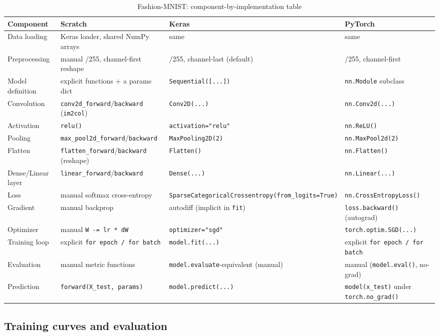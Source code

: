 \documentclass[11pt]{article}
\newcommand{\code}[1]{\texttt{#1}}
\begin{document}
\begin{table}[H]
\centering
\caption{Fashion-MNIST: component-by-implementation table}
\footnotesize
\begin{tabular}{@{}p{2.5cm}p{4.1cm}p{4.1cm}p{4.1cm}@{}}
\toprule
Component & Scratch & Keras & PyTorch \\
\midrule
Data loading & Keras loader, shared NumPy arrays & same & same \\
Preprocessing & manual /255, channel-first reshape & /255, channel-last (default) & /255, channel-first \\
Model definition & explicit functions $+$ a params dict & \code{Sequential([...])} & \code{nn.Module} subclass \\
Convolution & \code{conv2d\_forward}/\code{backward} (\code{im2col}) & \code{Conv2D(...)} & \code{nn.Conv2d(...)} \\
Activation & \code{relu()} & \code{activation="relu"} & \code{nn.ReLU()} \\
Pooling & \code{max\_pool2d\_forward}/\code{backward} & \code{MaxPooling2D(2)} & \code{nn.MaxPool2d(2)} \\
Flatten & \code{flatten\_forward}/\code{backward} (reshape) & \code{Flatten()} & \code{nn.Flatten()} \\
Dense/Linear layer & \code{linear\_forward}/\code{backward} & \code{Dense(...)} & \code{nn.Linear(...)} \\
Loss & manual softmax cross-entropy & \code{SparseCategorical}\allowbreak\code{Crossentropy(}\allowbreak\code{from\_logits=True)} & \code{nn.CrossEntropyLoss()} \\
Gradient & manual backprop & autodiff (implicit in \code{fit}) & \code{loss.backward()} (autograd) \\
Optimizer & manual \code{W -= lr * dW} & \code{optimizer="sgd"} & \code{torch.optim.SGD(...)} \\
Training loop & explicit \code{for epoch / for batch} & \code{model.fit(...)} & explicit \code{for epoch / for batch} \\
Evaluation & manual metric functions & \code{model.evaluate}-equivalent (manual) & manual (\code{model.eval()}, no-grad) \\
Prediction & \code{forward(X\_test, params)} & \code{model.predict(...)} & \code{model(x\_test)} under \code{torch.no\_grad()} \\
\bottomrule
\end{tabular}
\end{table}

\subsection{Training curves and evaluation}
\end{document}
